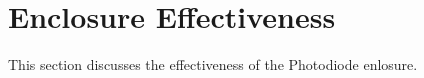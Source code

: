\section{Enclosure Effectiveness}
This section discusses the effectiveness of the Photodiode enlosure.

%         





